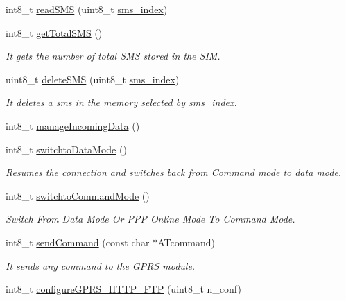 \begin{DoxyCompactItemize}
\item 
int8\+\_\+t \hyperlink{class_wasp_g_p_r_s___pro__core_af482736672798d68648ebae1828bba71}{read\+S\+MS} (uint8\+\_\+t \hyperlink{class_wasp_g_p_r_s___pro__core_aa3c60bd3ba8a89f7bf3ff764df8776c6}{sms\+\_\+index})
\item 
int8\+\_\+t \hyperlink{class_wasp_g_p_r_s___pro__core_aac7ab8f9a7333777d3427a7389b4fef9}{get\+Total\+S\+MS} ()
\begin{DoxyCompactList}\small\item\em It gets the number of total S\+MS stored in the S\+IM. \end{DoxyCompactList}\item 
uint8\+\_\+t \hyperlink{class_wasp_g_p_r_s___pro__core_a14c06b1f5c2be5249b04b9bf5ad910d0}{delete\+S\+MS} (uint8\+\_\+t \hyperlink{class_wasp_g_p_r_s___pro__core_aa3c60bd3ba8a89f7bf3ff764df8776c6}{sms\+\_\+index})
\begin{DoxyCompactList}\small\item\em It deletes a sms in the memory selected by sms\+\_\+index. \end{DoxyCompactList}\item 
int8\+\_\+t \hyperlink{class_wasp_g_p_r_s___pro__core_acda8578497d2560b19035455e987b0e3}{manage\+Incoming\+Data} ()
\item 
int8\+\_\+t \hyperlink{class_wasp_g_p_r_s___pro__core_ab1183b63819064b2220cad9f168acb23}{switchto\+Data\+Mode} ()
\begin{DoxyCompactList}\small\item\em Resumes the connection and switches back from Command mode to data mode. \end{DoxyCompactList}\item 
int8\+\_\+t \hyperlink{class_wasp_g_p_r_s___pro__core_ae0358611d14efe3f7fcdcb132f216ca6}{switchto\+Command\+Mode} ()
\begin{DoxyCompactList}\small\item\em Switch From Data Mode Or P\+PP Online Mode To Command Mode. \end{DoxyCompactList}\item 
int8\+\_\+t \hyperlink{class_wasp_g_p_r_s___pro__core_ab313897127e634b96e6d6ed60a3d953a}{send\+Command} (const char $\ast$A\+Tcommand)
\begin{DoxyCompactList}\small\item\em It sends any command to the G\+P\+RS module. \end{DoxyCompactList}\item 
int8\+\_\+t \hyperlink{class_wasp_g_p_r_s___pro__core_af3a957f211fd83f5885fd792cc4c446d}{configure\+G\+P\+R\+S\+\_\+\+H\+T\+T\+P\+\_\+\+F\+TP} (uint8\+\_\+t n\+\_\+conf)

\end{DoxyCompactItemize}

